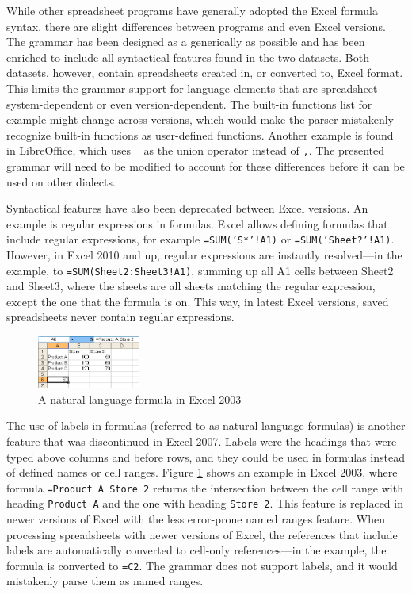 \documentclass[conference]{IEEEtran}
\begin{document}
While other spreadsheet programs have generally adopted the Excel formula syntax, there are slight differences between programs and even Excel versions.
The grammar has been designed as a generically as possible and has been enriched to include all syntactical features found in the two datasets.
Both datasets, however, contain spreadsheets created in, or converted to, Excel format.
This limits the grammar support for language elements that are spreadsheet system-dependent or even version-dependent.
The built-in functions list for example might change across versions, which would make the parser mistakenly recognize built-in functions as user-defined functions.
Another example is found in LibreOffice, which uses \texttt{~} as the union operator instead of \texttt{,}.
The presented grammar will need to be modified to account for these differences before it can be used on other dialects.

Syntactical features have also been deprecated between Excel versions.
An example is regular expressions in formulas.
Excel allows defining formulas that include regular expressions, for example \texttt{=SUM('S*'!A1)} or \texttt{=SUM('Sheet?'!A1)}.
However, in Excel 2010 and up, regular expressions are instantly resolved---in the example, to  \texttt{=SUM(Sheet2:Sheet3!A1)}, summing up all A1 cells between Sheet2 and Sheet3, where the sheets are all sheets matching the regular expression, except the one that the formula is on.
This way, in latest Excel versions, saved spreadsheets never contain regular expressions.
\begin{figure}
	\caption{A natural language formula in Excel 2003}
	\label{fig:labels}
	\centering
	\includegraphics[width=0.3\textwidth]{labels}
\end{figure}

The use of labels in formulas (referred to as natural language formulas) is another feature that was discontinued in Excel 2007.
Labels were the headings that were typed above columns and before rows, and they could be used in formulas instead of defined names or cell ranges.
Figure \ref{fig:labels} shows an example in Excel 2003, where formula \texttt{=Product A Store 2} returns the intersection between the cell range with heading \texttt{Product A} and the one with heading \texttt{Store 2}.
This feature is replaced in newer versions of Excel with the less error-prone named ranges feature.
When processing spreadsheets with newer versions of Excel, the references that include labels are automatically converted to cell-only references---in the example, the formula is converted to \texttt{=C2}.
The grammar does not support labels, and it would mistakenly parse them as named ranges.
\end{document}
